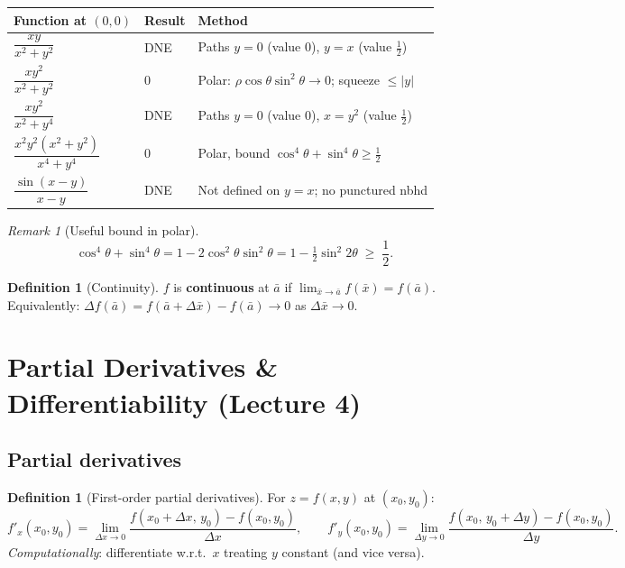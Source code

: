 \documentclass[12pt,a4paper]{article}
\theoremstyle{definition}
\newtheorem{definition}[theorem]{Definition}
\theoremstyle{remark}
\newtheorem{remark}[theorem]{Remark}
\newcommand{\xbar}{\bar{x}}
\newcommand{\abar}{\bar{a}}
\begin{document}
\begin{center}
\renewcommand{\arraystretch}{1.5}
\begin{tabular}{lll}
\toprule
Function at $(0,0)$ & Result & Method \\
\midrule
$\dfrac{xy}{x^2+y^2}$ & DNE & Paths $y=0$ (value 0), $y=x$ (value $\tfrac12$) \\[8pt]
$\dfrac{xy^2}{x^2+y^2}$ & $0$ & Polar: $\rho\cos\theta\sin^2\theta\to 0$; squeeze $\le|y|$ \\[8pt]
$\dfrac{xy^2}{x^2+y^4}$ & DNE & Paths $y=0$ (value 0), $x=y^2$ (value $\tfrac12$) \\[8pt]
$\dfrac{x^2y^2(x^2+y^2)}{x^4+y^4}$ & $0$ & Polar, bound $\cos^4\!\theta+\sin^4\!\theta\ge\tfrac12$ \\[8pt]
$\dfrac{\sin(x-y)}{x-y}$ & DNE & Not defined on $y=x$; no punctured nbhd \\
\bottomrule
\end{tabular}
\end{center}

\begin{remark}[Useful bound in polar]
\[
  \cos^4\!\theta + \sin^4\!\theta = 1 - 2\cos^2\!\theta\sin^2\!\theta = 1 - \tfrac12\sin^2\!2\theta \;\ge\; \frac{1}{2}.
\]
\end{remark}

\begin{definition}[Continuity]
$f$ is \textbf{continuous} at $\abar$ if $\displaystyle\lim_{\xbar\to\abar}f(\xbar)=f(\abar)$.
Equivalently: $\Delta f(\abar)=f(\abar+\Delta\xbar)-f(\abar)\to 0$ as $\Delta\xbar\to 0$.
\end{definition}

\section{Partial Derivatives \& Differentiability (Lecture 4)}

\subsection*{Partial derivatives}

\begin{definition}[First-order partial derivatives]
For $z=f(x,y)$ at $(x_0,y_0)$:
\[
  f'_x(x_0,y_0) = \lim_{\Delta x\to 0}\frac{f(x_0+\Delta x,\,y_0)-f(x_0,y_0)}{\Delta x},
  \qquad
  f'_y(x_0,y_0) = \lim_{\Delta y\to 0}\frac{f(x_0,\,y_0+\Delta y)-f(x_0,y_0)}{\Delta y}.
\]
\textit{Computationally}: differentiate w.r.t.\ $x$ treating $y$ constant (and vice versa).
\end{definition}
\end{document}
